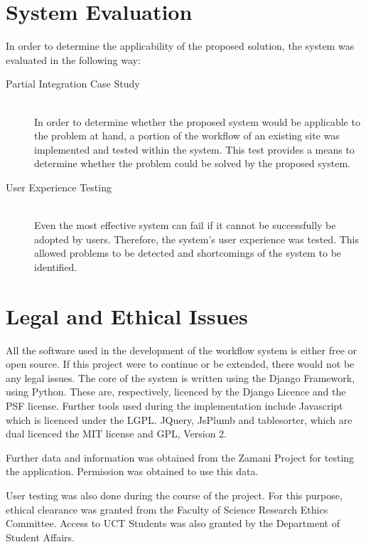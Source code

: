 \section{System Evaluation}
    In order to determine the applicability of the proposed solution, the system
    was evaluated in the following way:

    \begin{description}
        \item[Partial Integration Case Study]\hfill \\
            In order to determine whether the proposed system
            would be applicable to the problem at hand, a portion of the workflow
            of an existing site was implemented and tested within the system. This
            test provides a means to determine whether the problem could be solved
            by the proposed system.
        \item[User Experience Testing] \hfill \\
            Even the most effective system can fail if it cannot
            be successfully be adopted by users. Therefore, the system's
            user experience was tested. This allowed problems to be detected and
            shortcomings of the system to be identified\cite{tullis2008measuring}.
    \end{description}

\section{Legal and Ethical Issues}
    All the software used in the development of the workflow system
    is either free or open source. If this project were to continue
    or be extended, there would not be any legal issues. The core
    of the system is written using the Django Framework, using Python.
    These are, respectively, licenced by the Django Licence and the PSF
    license. Further tools used during the implementation include Javascript
    which is licenced under the LGPL.
    JQuery, JsPlumb and tablesorter, which are dual licenced the  MIT license 
    and GPL, Version 2.

    Further data and information was obtained from the Zamani Project for
    testing the application. Permission was obtained to use this data.

    User testing was also done during the course of the project. For
    this purpose, ethical clearance was granted from the Faculty of
    Science Research Ethics Committee. Access to UCT Students was also
    granted by the Department of Student Affairs.

